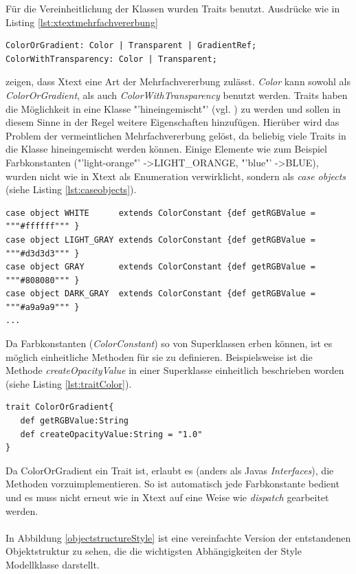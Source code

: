 Für die Vereinheitlichung der Klassen wurden Traits benutzt. Ausdrücke wie in Listing \ref{lst:xtextmehrfachvererbung}
\begin{lstlisting}[style=spray, caption = {Auszug aus der Style.xtext Grammatik, Color kann als ColorOrGradient oder als ColorWithTransparency benutzt werden}, label = {lst:xtextmehrfachvererbung}]
ColorOrGradient: Color | Transparent | GradientRef;
ColorWithTransparency: Color | Transparent;
\end{lstlisting}zeigen, dass Xtext eine Art der Mehrfachvererbung zulässt. \textit{Color} kann sowohl als \textit{ColorOrGradient}, als auch \textit{ColorWithTransparency} benutzt werden.
Traits haben die Möglichkeit in eine Klasse "'hineingemischt"' (vgl. ) zu werden und sollen in diesem Sinne in der Regel weitere Eigenschaften hinzufügen. Hierüber wird das Problem der vermeintlichen Mehrfachvererbung gelöst, da beliebig viele Traits in die Klasse hineingemischt werden können.
Einige Elemente wie zum Beispiel Farbkonstanten ("'light-orange"' -\textgreater LIGHT\_ORANGE, "'blue"' -\textgreater BLUE), wurden nicht wie in Xtext als Enumeration verwirklicht, sondern als \textit{case objects} (siehe Listing \ref{lst:caseobjects}).
\begin{lstlisting}[style=scala, caption = {Auszug aus Code ColorConstants als case objects}, label = {lst:caseobjects}]
case object WHITE      extends ColorConstant {def getRGBValue = """#ffffff""" }
case object LIGHT_GRAY extends ColorConstant {def getRGBValue = """#d3d3d3""" }
case object GRAY       extends ColorConstant {def getRGBValue = """#808080""" }
case object DARK_GRAY  extends ColorConstant {def getRGBValue = """#a9a9a9""" }
...
\end{lstlisting}Da Farbkonstanten (\textit{ColorConstant}) so von Superklassen erben können, ist es möglich einheitliche Methoden für sie zu definieren.
Beispielsweise ist die Methode \textit{createOpacityValue} in einer Superklasse einheitlich beschrieben worden (siehe Listing \ref{lst:traitColor}).\begin{lstlisting}[style=scala, caption = {Auszug aus Code Trait ColorOrGradient}, label = {lst:traitColor}]
trait ColorOrGradient{
   def getRGBValue:String
   def createOpacityValue:String = "1.0"
}
\end{lstlisting}Da ColorOrGradient ein Trait ist, erlaubt es (anders als Javas \textit{Interfaces}), die Methoden vorzuimplementieren. So ist automatisch jede Farbkonstante bedient und es muss nicht erneut wie in Xtext auf eine Weise wie \textit{dispatch} gearbeitet werden.\\\\In Abbildung \ref{objectstructureStyle} ist eine vereinfachte Version der entstandenen Objektstruktur zu sehen, die die wichtigsten Abhängigkeiten der Style Modellklasse darstellt.

